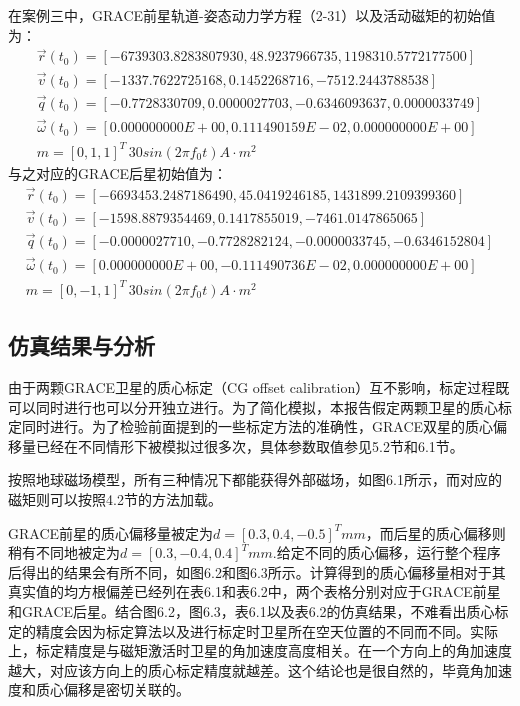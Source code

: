 \documentclass[UTF8,12pt,a4paper,floats,amsmath,amssymb]{ctexart}
\begin{document}
在案例三中，GRACE前星轨道-姿态动力学方程（2-31）以及活动磁矩的初始值为：
\begin{equation} \label{attitude_dynamics_3_front}
\begin{array}{l}
\vec{r}(t_0) = [-6739303.8283807930, 48.9237966735, 1198310.5772177500]\\
\vec{v}(t_0) = [-1337.7622725168, 0.1452268716, -7512.2443788538]\\
\vec{q}(t_0) = [-0.7728330709, 0.0000027703, -0.6346093637, 0.0000033749]\\
\vec{\omega}(t_0) = [0.000000000E+00, 0.111490159E-02, 0.000000000E+00]\\
m = {[0, 1, 1]}^{T} \, 30 sin(2 \pi f_0 t)A \cdot m^2
\end{array}
\end{equation}
与之对应的GRACE后星初始值为：
\begin{equation} \label{attitude_dynamics_3_back}
\begin{array}{l}
\vec{r}(t_0) = [-6693453.2487186490, 45.0419246185, 1431899.2109399360]\\
\vec{v}(t_0) = [-1598.8879354469, 0.1417855019, -7461.0147865065]\\
\vec{q}(t_0) = [-0.0000027710, -0.7728282124, -0.0000033745, -0.6346152804]\\
\vec{\omega}(t_0) = [0.000000000E+00, -0.111490736E-02, 0.000000000E+00]\\
m = {[0, -1, 1]}^{T} \, 30 sin(2 \pi f_0 t)A \cdot m^2
\end{array}
\end{equation}

\subsection{仿真结果与分析}
由于两颗GRACE卫星的质心标定（CG offset calibration）互不影响，标定过程既可以同时进行也可以分开独立进行。为了简化模拟，本报告假定两颗卫星的质心标定同时进行。为了检验前面提到的一些标定方法的准确性，GRACE双星的质心偏移量已经在不同情形下被模拟过很多次，具体参数取值参见5.2节和6.1节。

按照地球磁场模型，所有三种情况下都能获得外部磁场，如图6.1所示，而对应的磁矩则可以按照4.2节的方法加载。

GRACE前星的质心偏移量被定为$d = {[0.3,0.4,-0.5]}^{T} mm$，而后星的质心偏移则稍有不同地被定为$d = {[0.3,-0.4,0.4]}^{T} mm$.给定不同的质心偏移，运行整个程序后得出的结果会有所不同，如图6.2和图6.3所示。计算得到的质心偏移量相对于其真实值的均方根偏差已经列在表6.1和表6.2中，两个表格分别对应于GRACE前星和GRACE后星。结合图6.2，图6.3，表6.1以及表6.2的仿真结果，不难看出质心标定的精度会因为标定算法以及进行标定时卫星所在空天位置的不同而不同。实际上，标定精度是与磁矩激活时卫星的角加速度高度相关。在一个方向上的角加速度越大，对应该方向上的质心标定精度就越差。这个结论也是很自然的，毕竟角加速度和质心偏移是密切关联的。
\end{document}
